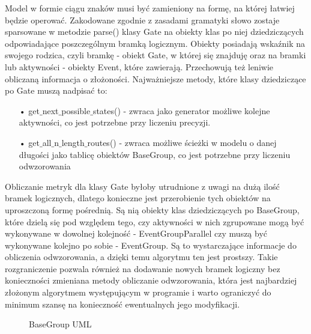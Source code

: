 Model w formie ciągu znaków musi być zamieniony na formę, na której łatwiej będzie operować. Zakodowane zgodnie z zasadami gramatyki słowo zostaje sparsowane w metodzie parse() klasy Gate na obiekty klas po niej dziedziczących odpowiadające poszczególnym bramką logicznym. Obiekty posiadają wskaźnik na swojego rodzica, czyli bramkę - obiekt Gate, w której się znajduję oraz na bramki lub aktywności - obiekty Event, które zawierają. Przechowują też leniwie obliczaną informacja o złożoności. Najważniejsze metody, które klasy dziedziczące po Gate muszą nadpisać to:
\begin{itemize}
  \item[•] get$\_$next$\_$possible$\_$states() - zwraca jako generator możliwe kolejne aktywności, co jest potrzebne przy liczeniu precyzji.
  \item[•] get$\_$all$\_$n$\_$length$\_$routes() - zwraca możliwe ścieżki w modelu o danej długości jako tablicę obiektów BaseGroup, co jest potrzebne przy liczeniu odwzorowania
\end{itemize}

Obliczanie metryk dla klasy Gate byłoby utrudnione z uwagi na dużą ilość bramek logicznych, dlatego konieczne jest przerobienie tych obiektów na uproszczoną formę pośrednią. Są nią obiekty klas dziedziczących po BaseGroup, które dzielą się pod względem tego, czy aktywności w nich zgrupowane mogą być wykonywane w dowolnej kolejność - EventGroupParallel czy muszą być wykonywane kolejno po sobie - EventGroup. Są to wystarczające informacje do obliczenia odwzorowania, a dzięki temu algorytmu ten jest prostszy. Takie rozgraniczenie pozwala również na dodawanie nowych bramek logiczny bez konieczności zmieniana metody obliczanie odwzorowania, która jest najbardziej złożonym algorytmem występującym w programie i warto ograniczyć do minimum szansę na konieczność ewentualnych jego modyfikacji. 

\begin{figure}[h]
	\caption{\label{fig:subcaption_example}BaseGroup UML}
\end{figure}

